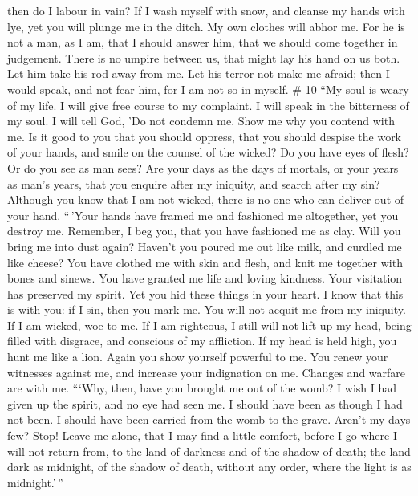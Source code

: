then do I labour in vain?  If I wash myself with snow,
and cleanse my hands with lye,  yet you will plunge me in
the ditch. My own clothes will abhor me.  For he is not a
man, as I am, that I should answer him, that we should come together in
judgement.  There is no umpire between us, that might lay
his hand on us both.  Let him take his rod away from me.
Let his terror not make me afraid;  then I would speak,
and not fear him, for I am not so in myself. \# 10  ``My
soul is weary of my life. I will give free course to my complaint. I
will speak in the bitterness of my soul.  I will tell God,
'Do not condemn me. Show me why you contend with me.  Is
it good to you that you should oppress, that you should despise the work
of your hands, and smile on the counsel of the wicked?  Do
you have eyes of flesh? Or do you see as man sees?  Are
your days as the days of mortals, or your years as man's years,
 that you enquire after my iniquity, and search after my
sin?  Although you know that I am not wicked, there is no
one who can deliver out of your hand.  ``\,'Your hands
have framed me and fashioned me altogether, yet you destroy me.
 Remember, I beg you, that you have fashioned me as clay.
Will you bring me into dust again?  Haven't you poured me
out like milk, and curdled me like cheese?  You have
clothed me with skin and flesh, and knit me together with bones and
sinews.  You have granted me life and loving kindness.
Your visitation has preserved my spirit.  Yet you hid
these things in your heart. I know that this is with you:
 if I sin, then you mark me. You will not acquit me from
my iniquity.  If I am wicked, woe to me. If I am
righteous, I still will not lift up my head, being filled with disgrace,
and conscious of my affliction.  If my head is held high,
you hunt me like a lion. Again you show yourself powerful to me.
 You renew your witnesses against me, and increase your
indignation on me. Changes and warfare are with me. 
```Why, then, have you brought me out of the womb? I wish I had given up
the spirit, and no eye had seen me.  I should have been
as though I had not been. I should have been carried from the womb to
the grave.  Aren't my days few? Stop! Leave me alone,
that I may find a little comfort,  before I go where I
will not return from, to the land of darkness and of the shadow of
death;  the land dark as midnight, of the shadow of
death, without any order, where the light is as midnight.'\,''

